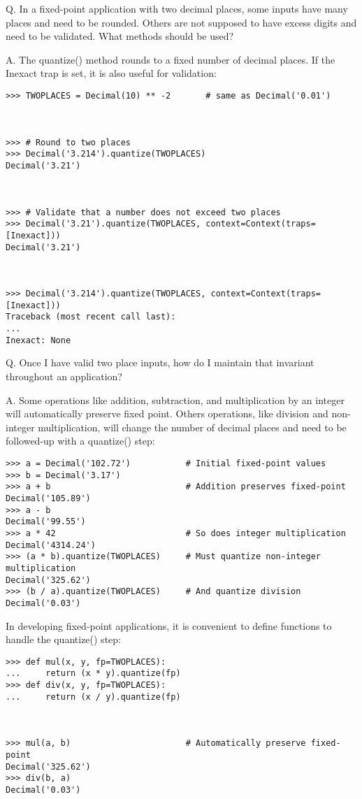 Q. In a fixed-point application with two decimal places, some inputs have many places and need to be rounded. Others are not supposed to have excess digits and need to be validated. What methods should be used?

A. The quantize() method rounds to a fixed number of decimal places. If the Inexact trap is set, it is also useful for validation:

\begin{lstlisting}
>>> TWOPLACES = Decimal(10) ** -2       # same as Decimal('0.01')



>>> # Round to two places
>>> Decimal('3.214').quantize(TWOPLACES)
Decimal('3.21')



>>> # Validate that a number does not exceed two places
>>> Decimal('3.21').quantize(TWOPLACES, context=Context(traps=[Inexact]))
Decimal('3.21')



>>> Decimal('3.214').quantize(TWOPLACES, context=Context(traps=[Inexact]))
Traceback (most recent call last):
...
Inexact: None
\end{lstlisting}

Q. Once I have valid two place inputs, how do I maintain that invariant throughout an application?

A. Some operations like addition, subtraction, and multiplication by an integer will automatically preserve fixed point. Others operations, like division and non-integer multiplication, will change the number of decimal places and need to be followed-up with a quantize() step:

\begin{lstlisting}
>>> a = Decimal('102.72')           # Initial fixed-point values
>>> b = Decimal('3.17')
>>> a + b                           # Addition preserves fixed-point
Decimal('105.89')
>>> a - b
Decimal('99.55')
>>> a * 42                          # So does integer multiplication
Decimal('4314.24')
>>> (a * b).quantize(TWOPLACES)     # Must quantize non-integer multiplication
Decimal('325.62')
>>> (b / a).quantize(TWOPLACES)     # And quantize division
Decimal('0.03')
\end{lstlisting}

In developing fixed-point applications, it is convenient to define functions to handle the quantize() step:

\begin{lstlisting}
>>> def mul(x, y, fp=TWOPLACES):
...     return (x * y).quantize(fp)
>>> def div(x, y, fp=TWOPLACES):
...     return (x / y).quantize(fp)



>>> mul(a, b)                       # Automatically preserve fixed-point
Decimal('325.62')
>>> div(b, a)
Decimal('0.03')
\end{lstlisting}

